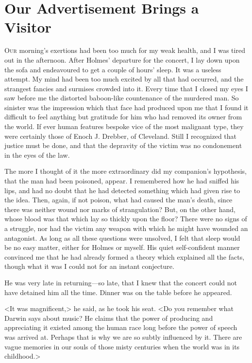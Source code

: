 \chapter{Our Advertisement Brings a Visitor}
\lettrine{O}{ur} morning's exertions had been too much for my weak health, and I was tired out in the afternoon. After Holmes' departure for the concert, I lay down upon the sofa and endeavoured to get a couple of hours' sleep. It was a useless attempt. My mind had been too much excited by all that had occurred, and the strangest fancies and surmises crowded into it. Every time that I closed my eyes I saw before me the distorted baboon-like countenance of the murdered man. So sinister was the impression which that face had produced upon me that I found it difficult to feel anything but gratitude for him who had removed its owner from the world. If ever human features bespoke vice of the most malignant type, they were certainly those of Enoch J. Drebber, of Cleveland. Still I recognized that justice must be done, and that the depravity of the victim was no condonement in the eyes of the law.

The more I thought of it the more extraordinary did my companion's hypothesis, that the man had been poisoned, appear. I remembered how he had sniffed his lips, and had no doubt that he had detected something which had given rise to the idea. Then, again, if not poison, what had caused the man's death, since there was neither wound nor marks of strangulation? But, on the other hand, whose blood was that which lay so thickly upon the floor? There were no signs of a struggle, nor had the victim any weapon with which he might have wounded an antagonist. As long as all these questions were unsolved, I felt that sleep would be no easy matter, either for Holmes or myself. His quiet self-confident manner convinced me that he had already formed a theory which explained all the facts, though what it was I could not for an instant conjecture.

He was very late in returning—so late, that I knew that the concert could not have detained him all the time. Dinner was on the table before he appeared.

<It was magnificent,> he said, as he took his seat. <Do you remember what Darwin says about music? He claims that the power of producing and appreciating it existed among the human race long before the power of speech was arrived at. Perhaps that is why we are so subtly influenced by it. There are vague memories in our souls of those misty centuries when the world was in its childhood.>

